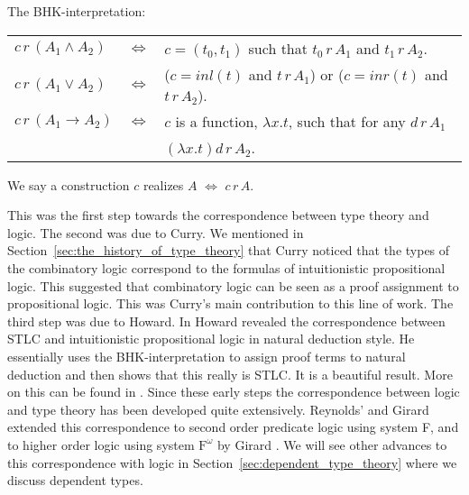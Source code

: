 \begin{definition}
  \label{def:bhk-interpretation}
  The BHK-interpretation:\\
  \begin{center}
          \begin{tabular}{lll}
      $c\,r\,(A_1 \land A_2)$ & $\iff$ & $c = (t_0,t_1)$ such that $t_0\,r\,A_1$ and 
            $t_1\,r\,A_2$.\\
      $c\,r\,(A_1 \lor A_2)$  & $\iff$ & ($c = inl(t)$ and $t\,r\,A_1$) or ($c = inr(t)$ and 
            $t\,r\,A_2$).\\
      $c\,r\,(A_1 \to A_2)$   & $\iff$ & $c$ is a function, $\lambda x.t$, such that for any 
            $d\,r\,A_1$ \\
                              &     & $(\lambda x.t)d\,r\,A_2$.
    \end{tabular}
  \end{center}
  We say a construction $c$ realizes $A$ $\iff$ $c\,r\,A$.  
\end{definition}
This was the first step towards the correspondence between type theory
and logic.  The second was due to Curry.  We mentioned in
Section~\ref{sec:the_history_of_type_theory} that Curry noticed that the
types of the combinatory logic correspond to the formulas of
intuitionistic propositional logic.  This suggested that combinatory
logic can be seen as a proof assignment to propositional logic.  This
was Curry's main contribution to this line of work.  The third step
was due to Howard.  In \cite{Howard:1980} Howard revealed the
correspondence between STLC and intuitionistic propositional logic in
natural deduction style.  He essentially uses the BHK-interpretation
to assign proof terms to natural deduction and then shows that this
really is STLC.  It is a beautiful result.  More on this can be found
in
\cite{Griffin:1990,Howard:1980,Mints:2000,Murthy:1991,Sorensen:2006,Troelstra:1991}.
Since these early steps the correspondence between logic and type
theory has been developed quite extensively.  Reynolds' and Girard
extended this correspondence to second order predicate logic using
system F, and to higher order logic using system $\text{F}^\omega$ by
Girard \cite{Wadler:2007,Girard:1971}.  We will see other advances to this
correspondence with logic in Section~\ref{sec:dependent_type_theory} where
we discuss dependent types.

